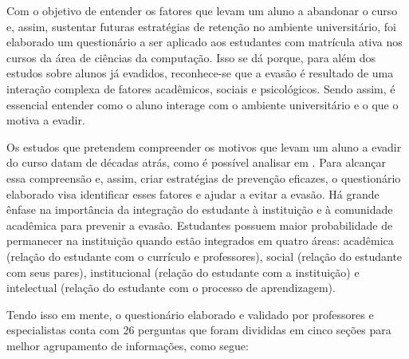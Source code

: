 \documentclass[12pt]{article}
\begin{document}
Com o objetivo de entender os fatores que levam um aluno a abandonar o curso e, assim, sustentar futuras estratégias de retenção no ambiente universitário, foi elaborado um questionário a ser aplicado aos estudantes com matrícula ativa nos cursos da área de ciências da computação. Isso se dá porque, para além dos estudos sobre alunos já evadidos, reconhece-se que a evasão é resultado de uma interação complexa de fatores acadêmicos, sociais e psicológicos. Sendo assim, é essencial entender como o aluno interage com o ambiente universitário e o que o motiva a evadir.

Os estudos que pretendem compreender os motivos que levam um aluno a evadir do curso datam de décadas atrás, como é possível analisar em \cite{tinto:75}. Para alcançar essa compreensão e, assim, criar estratégias de prevenção eficazes, o questionário elaborado visa identificar esses fatores e ajudar a evitar a evasão. Há grande ênfase na importância da integração do estudante à instituição e à comunidade acadêmica para prevenir a evasão. Estudantes possuem maior probabilidade de permanecer na instituição quando estão integrados em quatro áreas: acadêmica (relação do estudante com o currículo e professores), social (relação do estudante com seus pares), institucional (relação do estudante com a instituição) e intelectual (relação do estudante com o processo de aprendizagem). 

Tendo isso em mente, o questionário elaborado e validado por professores e especialistas conta com 26 perguntas que foram divididas em cinco seções para melhor agrupamento de informações, como segue:
\end{document}
